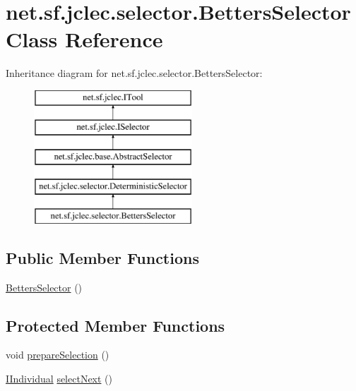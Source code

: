 \hypertarget{classnet_1_1sf_1_1jclec_1_1selector_1_1_betters_selector}{\section{net.\-sf.\-jclec.\-selector.\-Betters\-Selector Class Reference}
\label{classnet_1_1sf_1_1jclec_1_1selector_1_1_betters_selector}
}
Inheritance diagram for net.\-sf.\-jclec.\-selector.\-Betters\-Selector\-:\begin{figure}[H]
\begin{center}
\leavevmode
\includegraphics[height=5.000000cm]{classnet_1_1sf_1_1jclec_1_1selector_1_1_betters_selector}
\end{center}
\end{figure}
\subsection*{Public Member Functions}
\begin{DoxyCompactItemize}
\item 
\hyperlink{classnet_1_1sf_1_1jclec_1_1selector_1_1_betters_selector_a539ecdfd09de70e7f71d43a92506e5bc}{Betters\-Selector} ()
\end{DoxyCompactItemize}
\subsection*{Protected Member Functions}
\begin{DoxyCompactItemize}
\item 
void \hyperlink{classnet_1_1sf_1_1jclec_1_1selector_1_1_betters_selector_a6e1bf12a092b5d3cc1ac8010aa032480}{prepare\-Selection} ()
\item 
\hyperlink{interfacenet_1_1sf_1_1jclec_1_1_i_individual}{I\-Individual} \hyperlink{classnet_1_1sf_1_1jclec_1_1selector_1_1_betters_selector_aafc05c782c8e38e6c39130fc3c1fa1a3}{select\-Next} ()
\end{DoxyCompactItemize}
